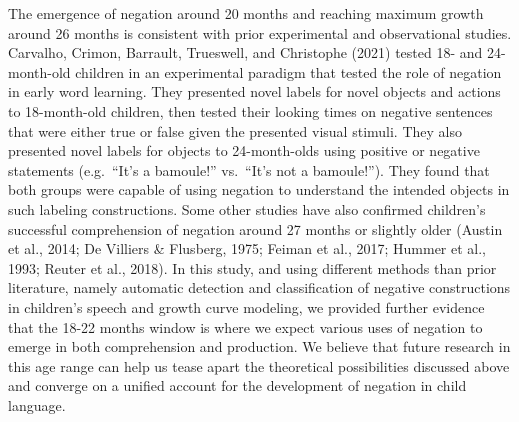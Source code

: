\documentclass[
  man,floatsintext]{apa6}
\begin{document}
The emergence of negation around 20 months and reaching maximum growth around 26 months is consistent with prior experimental and observational studies. Carvalho, Crimon, Barrault, Trueswell, and Christophe (2021) tested 18- and 24-month-old children in an experimental paradigm that tested the role of negation in early word learning. They presented novel labels for novel objects and actions to 18-month-old children, then tested their looking times on negative sentences that were either true or false given the presented visual stimuli. They also presented novel labels for objects to 24-month-olds using positive or negative statements (e.g.~``It's a bamoule!'' vs.~``It's not a bamoule!''). They found that both groups were capable of using negation to understand the intended objects in such labeling constructions. Some other studies have also confirmed children's successful comprehension of negation around 27 months or slightly older (Austin et al., 2014; De Villiers \& Flusberg, 1975; Feiman et al., 2017; Hummer et al., 1993; Reuter et al., 2018). In this study, and using different methods than prior literature, namely automatic detection and classification of negative constructions in children's speech and growth curve modeling, we provided further evidence that the 18-22 months window is where we expect various uses of negation to emerge in both comprehension and production. We believe that future research in this age range can help us tease apart the theoretical possibilities discussed above and converge on a unified account for the development of negation in child language.
\end{document}
